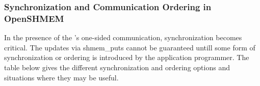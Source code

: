 \subsubsection{Synchronization and Communication Ordering in OpenSHMEM}

In the presence of the \openshmem's one-sided communication, synchronization becomes critical. The updates via shmem\_puts cannot be guaranteed untill some form of synchronization or ordering is introduced by the application programmer. The table below gives the different synchronization and ordering options and situations where they may be useful.\\

